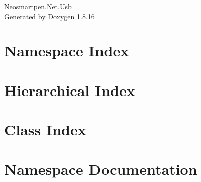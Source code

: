 \let\mypdfximage\pdfximage\def\pdfximage{\immediate\mypdfximage}\documentclass[twoside]{book}
\newcommand{\+}{\discretionary{\mbox{\scriptsize$\hookleftarrow$}}{}{}}
\newcommand{\clearemptydoublepage}{%
  \newpage{\pagestyle{empty}\cleardoublepage}%
}
\begin{document}
\hypersetup{pageanchor=false,
             bookmarksnumbered=true,
             pdfencoding=unicode
            }
\begin{titlepage}
\vspace*{7cm}
\begin{center}%
{\Large Neosmartpen.\+Net.\+Usb }\\
\vspace*{1cm}
{\large Generated by Doxygen 1.8.16}\\
\end{center}
\end{titlepage}
\clearemptydoublepage
{}
\tableofcontents
\clearemptydoublepage
{}
\hypersetup{pageanchor=true}

\chapter{Namespace Index}

\chapter{Hierarchical Index}

\chapter{Class Index}

\chapter{Namespace Documentation}





\end{document}
